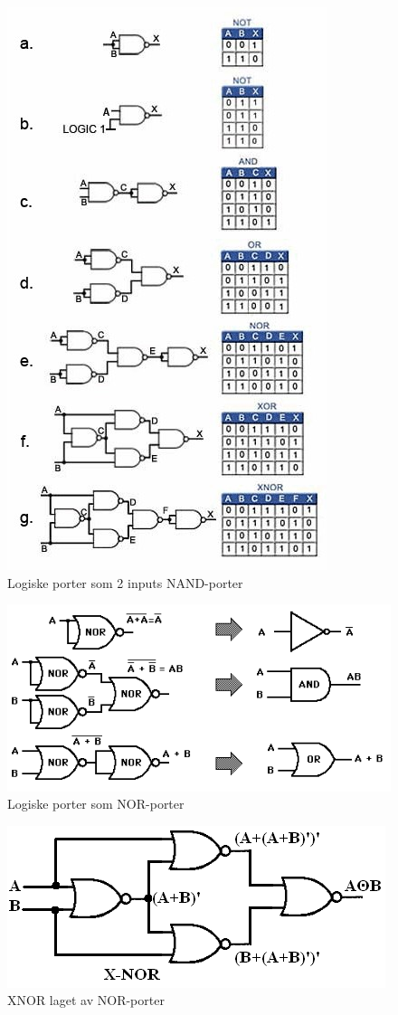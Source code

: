\documentclass{article}
\begin{document}
	\begin{figure}[H]
		\includegraphics{NAND.jpg}
		\caption{Logiske porter som 2 inputs NAND-porter}
	\end{figure}
	
		
	\begin{figure}[H]
		\includegraphics[scale=0.6]{nor.png}
		\caption{Logiske porter som NOR-porter}
	\end{figure}
	
	\begin{figure}[H]
		\includegraphics[scale=0.6]{NasX.PNG}
		\caption{XNOR laget av NOR-porter}
	\end{figure}
	
\end{document}
